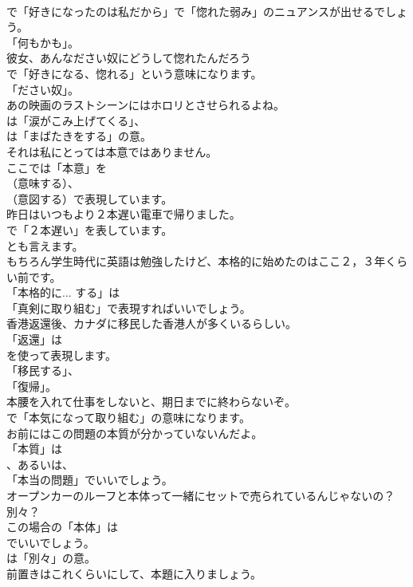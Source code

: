 \documentclass[8pt]{extreport}
\begin{document}
\begin{CJK}{UTF8}{min}
\\	で「好きになったのは私だから」で「惚れた弱み」のニュアンスが出せるでしょう。
\\	「何もかも」。	
\\	彼女、あんなださい奴にどうして惚れたんだろう 
\\	で「好きになる、惚れる」という意味になります。
\\	「ださい奴」。	
\\	あの映画のラストシーンにはホロリとさせられるよね。 
\\	は「涙がこみ上げてくる」、
\\	は「まばたきをする」の意。	
\\	それは私にとっては本意ではありません。 
\\	ここでは「本意」を
\\	（意味する）、
\\	（意図する）で表現しています。	
\\	昨日はいつもより２本遅い電車で帰りました。 
\\	で「２本遅い」を表しています。
\\	とも言えます。	
\\	もちろん学生時代に英語は勉強したけど、本格的に始めたのはここ２，３年くらい前です。 
\\	「本格的に... する」は
\\	「真剣に取り組む」で表現すればいいでしょう。	
\\	香港返還後、カナダに移民した香港人が多くいるらしい。 
\\	「返還」は
\\	を使って表現します。
\\	「移民する」、
\\	「復帰」。	
\\	本腰を入れて仕事をしないと、期日までに終わらないぞ。 
\\	で「本気になって取り組む」の意味になります。	
\\	お前にはこの問題の本質が分かっていないんだよ。 
\\	「本質」は
\\	、あるいは、
\\	「本当の問題」でいいでしょう。	
\\	オープンカーのルーフと本体って一緒にセットで売られているんじゃないの？別々？ 
\\	この場合の「本体」は 
\\	でいいでしょう。
\\	は「別々」の意。	
\\	前置きはこれくらいにして、本題に入りましょう。 

\end{CJK}
\end{document}
